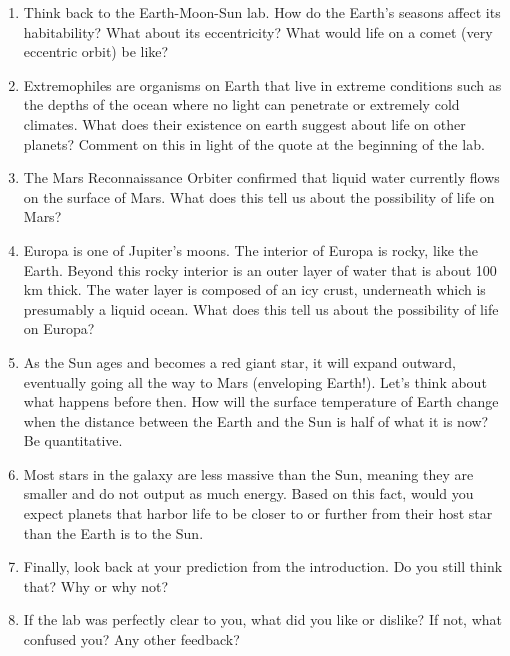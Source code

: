 \documentclass[10pt]{article}%
\begin{document}
\begin{enumerate}

\item Think back to the Earth-Moon-Sun lab. How do the Earth's seasons affect its habitability? What about its eccentricity? What would life on a comet (very eccentric orbit) be like? 

\item Extremophiles are organisms on Earth that live in extreme conditions such as the depths of the ocean where no light can penetrate or extremely cold climates.  
What does their existence on earth suggest about life on other planets? Comment on this in light of the quote at the beginning of the lab.

\item The Mars Reconnaissance Orbiter confirmed that liquid water currently flows on the surface of Mars. 
What does this tell us about the possibility of life on Mars?   

\item Europa is one of Jupiter's moons.  
The interior of Europa is rocky, like the Earth.  
Beyond this rocky interior is an outer layer of water that is about 100 km thick.  
The water layer is composed of an icy crust, underneath which is presumably a liquid ocean.  
What does this tell us about the possibility of life on Europa?  

\item As the Sun ages and becomes a red giant star, it will expand outward, eventually going all the way to Mars (enveloping Earth!).  
Let's think about what happens before then.  
How will the surface temperature of Earth change when the distance between the Earth and the Sun is half of what it is now? Be quantitative.

\item Most stars in the galaxy are less massive than the Sun, meaning they are smaller and do not output as much energy. 
Based on this fact, would you expect planets that harbor life to be closer to or further from their host star than the Earth is to the Sun.

\item Finally, look back at your prediction from the introduction. Do you still think that? Why or why not?

\item If the lab was perfectly clear to you, what did you like or dislike? 
If not, what confused you? Any other feedback?

\end{enumerate}
\end{document}
